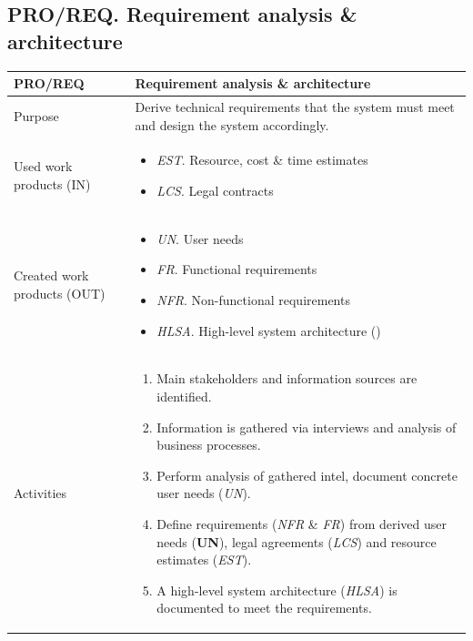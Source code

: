 \subsection{PRO/REQ. Requirement analysis \& architecture } %
\begin{table}[h!]
\begin{tabular}{l|p{}}
\hline
\textbf{PRO/REQ}        & \textbf{Requirement analysis \& architecture} \\ \hline Purpose &
Derive technical requirements that the system must meet and design the system accordingly. \\ \hline

Used work products (IN)   &      
\begin{itemize}
    \item \textit{EST}. Resource, cost \& time estimates
    \item \textit{LCS}. Legal contracts
\end{itemize}
\\ \hline
Created work products (OUT) &     
\begin{itemize}
    \item \textit{UN}. User needs
    \item \textit{FR}. Functional requirements
    \item \textit{NFR}. Non-functional requirements
    \item \textit{HLSA}. High-level system architecture ()
\end{itemize}
\\ \hline
Activities            &   
\begin{enumerate}
  \item Main stakeholders and information sources are identified.
  \item Information is gathered via interviews and analysis of business processes.
  \item Perform analysis of gathered intel, document concrete user needs (\textit{UN}).
  \item Define requirements (\textit{NFR} \& \textit{FR}) from derived user needs (\textbf{UN}), legal agreements (\textit{LCS}) and resource estimates (\textit{EST}).
  \item A high-level system architecture (\textit{HLSA}) is documented to meet the requirements.
\end{enumerate}
\\ \hline
\end{tabular}

\label{pro/plan}
\end{table}


